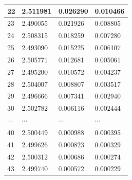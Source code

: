 \documentclass[UTF8]{ctexart}
\begin{document}
\begin{table}[]
\begin{tabular}{llll}
		22                                & 2.511981                           & 0.026290                        & 0.010466                          \\ \hline
		23                                & 2.490055                           & 0.021926                        & 0.008805                          \\ \hline
		24                                & 2.508315                           & 0.018259                        & 0.007280                          \\ \hline
		25                                & 2.493090                           & 0.015225                        & 0.006107                          \\ \hline
		26                                & 2.505771                           & 0.012681                        & 0.005061                          \\ \hline
		27                                & 2.495200                           & 0.010572                        & 0.004237                          \\ \hline
		28                                & 2.504007                           & 0.008807                        & 0.003517                          \\ \hline
		29                                & 2.496666                           & 0.007341                        & 0.002940                          \\ \hline
		30                                & 2.502782                           & 0.006116                        & 0.002444                          \\ \hline
		$\cdots$                          & $\cdots$                           & $\cdots$                        & $\cdots$                          \\ \hline
		40                                & 2.500449                           & 0.000988                        & 0.000395                          \\ \hline
		41                                & 2.499626                           & 0.000823                        & 0.000329                          \\ \hline
		42                                & 2.500312                           & 0.000686                        & 0.000274                          \\ \hline
		43                                & 2.499740                           & 0.000572                        & 0.000229                          \\ \hline

\end{tabular}
\end{table}
\end{document}
